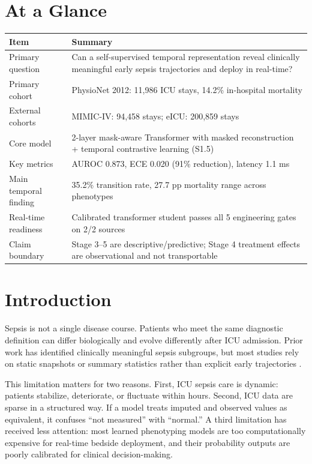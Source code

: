 \documentclass[11pt,a4paper]{article}
\begin{document}
\section*{At a Glance}
\begin{tabularx}{\textwidth}{lX}
\toprule
\textbf{Item} & \textbf{Summary} \\
\midrule
Primary question & Can a self-supervised temporal representation reveal clinically meaningful early sepsis trajectories and deploy in real-time? \\
Primary cohort & PhysioNet 2012: 11,986 ICU stays, 14.2\% in-hospital mortality \\
External cohorts & MIMIC-IV: 94,458 stays; eICU: 200,859 stays \\
Core model & 2-layer mask-aware Transformer with masked reconstruction + temporal contrastive learning (S1.5) \\
Key metrics & AUROC 0.873, ECE 0.020 (91\% reduction), latency 1.1 ms \\
Main temporal finding & 35.2\% transition rate, 27.7 pp mortality range across phenotypes \\
Real-time readiness & Calibrated transformer student passes all 5 engineering gates on 2/2 sources \\
Claim boundary & Stage 3--5 are descriptive/predictive; Stage 4 treatment effects are observational and not transportable \\
\bottomrule
\end{tabularx}

\section{Introduction}

Sepsis is not a single disease course. Patients who meet the same diagnostic definition can differ biologically and evolve differently after ICU admission. Prior work has identified clinically meaningful sepsis subgroups, but most studies rely on static snapshots or summary statistics rather than explicit early trajectories \cite{rudd2020,singer2016,seymour2019}.

This limitation matters for two reasons. First, ICU sepsis care is dynamic: patients stabilize, deteriorate, or fluctuate within hours. Second, ICU data are sparse in a structured way. If a model treats imputed and observed values as equivalent, it confuses ``not measured'' with ``normal.'' A third limitation has received less attention: most learned phenotyping models are too computationally expensive for real-time bedside deployment, and their probability outputs are poorly calibrated for clinical decision-making.
\end{document}

